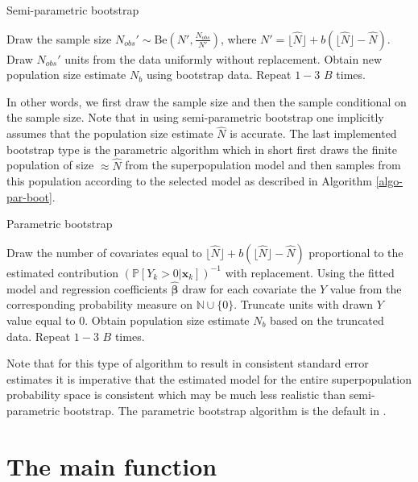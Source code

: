 \documentclass[
]{jss}
\newcommand{\1}{\mathcal{I}} \newcommand{\bZero}{\boldsymbol{0}}
\begin{document}
\begin{algorithm}[ht!]
\small
\caption{Semi-parametric bootstrap}
\label{algo-semipar-boot}\DontPrintSemicolon
{} Draw the sample size $N_{obs}'\sim\text{Be}\left(N', \frac{N_{obs}}{N'}\right)$, where $N'=\lfloor\hat{N}\rfloor+b\left(\lfloor\hat{N}\rfloor-\hat{N}\right)$.\;
 Draw $N_{obs}'$ units from the data uniformly without replacement.\;
 Obtain new population size estimate $N_b$ using bootstrap data.\;
 Repeat $1-3$ $B$ times.
\end{algorithm}

In other words, we first draw the sample size and then the sample
conditional on the sample size. Note that in using semi-parametric
bootstrap one implicitly assumes that the population size estimate
\(\hat{N}\) is accurate. The last implemented bootstrap type is the
parametric algorithm which in short first draws the finite population of
size \(\approx\hat{N}\) from the superpopulation model and then samples
from this population according to the selected model as described in
Algorithm \ref{algo-par-boot}.

\begin{algorithm}[ht!]
\small
\caption{Parametric bootstrap}
\label{algo-par-boot}\DontPrintSemicolon
{} Draw the number of covariates equal to $\lfloor\hat{N}\rfloor+b\left(\lfloor\hat{N}\rfloor-\hat{N}\right)$ proportional to the estimated contribution $(\mathbb{P}\left[Y_{k}>0|\boldsymbol{x}_{k}\right])^{-1}$ with replacement.\;
 Using the fitted model and regression coefficients $\hat{\boldsymbol{\beta}}$ draw for each covariate the $Y$ value from the corresponding probability measure on $\mathbb{N}\cup\{0\}$.\;
 Truncate units with drawn $Y$ value equal to $0$.\;
 Obtain population size estimate $N_b$ based on the truncated data.\;
 Repeat $1-3$ $B$ times.
\end{algorithm}

Note that for this type of algorithm to result in consistent standard
error estimates it is imperative that the estimated model for the entire
superpopulation probability space is consistent which may be much less
realistic than semi-parametric bootstrap. The parametric bootstrap
algorithm is the default in .

\section{The main function}\label{sec-main}
\end{document}
